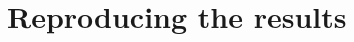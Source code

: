 \documentclass[
fontsize=11pt,
paper=a4,
numbers=noenddot
]{scrartcl}
\begin{document}
\appendix
\section{Reproducing the results}


\printbibliography
\end{document}
